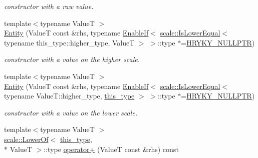 \begin{DoxyCompactItemize}
\begin{DoxyCompactList}\small\item\em constructor with a raw value. \end{DoxyCompactList}\item 
\hypertarget{classhryky_1_1scale_1_1_entity_a1928287ec77e5a97d0b700d4406a5f54}{{\footnotesize template$<$typename Value\-T $>$ }\\\hyperlink{classhryky_1_1scale_1_1_entity_a1928287ec77e5a97d0b700d4406a5f54}{Entity} (Value\-T const \&rhs, typename \hyperlink{classhryky_1_1_enable_if}{Enable\-If}$<$ \hyperlink{classhryky_1_1scale_1_1_is_lower_equal}{scale\-::\-Is\-Lower\-Equal}$<$ typename this\-\_\-type\-::higher\-\_\-type, Value\-T $>$ $>$\-::type $\ast$=\hyperlink{common_8h_a4cd4ac09cfcdbd6b30ee69afc156e210}{H\-R\-Y\-K\-Y\-\_\-\-N\-U\-L\-L\-P\-T\-R})}\label{classhryky_1_1scale_1_1_entity_a1928287ec77e5a97d0b700d4406a5f54}

\begin{DoxyCompactList}\small\item\em constructor with a value on the higher scale. \end{DoxyCompactList}\item 
\hypertarget{classhryky_1_1scale_1_1_entity_a1a7021b0210b2967d25f541371468947}{{\footnotesize template$<$typename Value\-T $>$ }\\\hyperlink{classhryky_1_1scale_1_1_entity_a1a7021b0210b2967d25f541371468947}{Entity} (Value\-T const \&rhs, typename \hyperlink{classhryky_1_1_enable_if}{Enable\-If}$<$ \hyperlink{classhryky_1_1scale_1_1_is_lower_equal}{scale\-::\-Is\-Lower\-Equal}$<$ typename Value\-T\-::higher\-\_\-type, \hyperlink{classhryky_1_1scale_1_1_entity_af312f46dc3d31369144a960d386790c3}{this\-\_\-type} $>$ $>$\-::type $\ast$=\hyperlink{common_8h_a4cd4ac09cfcdbd6b30ee69afc156e210}{H\-R\-Y\-K\-Y\-\_\-\-N\-U\-L\-L\-P\-T\-R})}\label{classhryky_1_1scale_1_1_entity_a1a7021b0210b2967d25f541371468947}

\begin{DoxyCompactList}\small\item\em constructor with a value on the lower scale. \end{DoxyCompactList}\item 
\hypertarget{classhryky_1_1scale_1_1_entity_a0e711f3283eab1061dc77c94bcb13ccf}{{\footnotesize template$<$typename Value\-T $>$ }\\\hyperlink{classhryky_1_1scale_1_1_lower_of}{scale\-::\-Lower\-Of}$<$ \hyperlink{classhryky_1_1scale_1_1_entity_af312f46dc3d31369144a960d386790c3}{this\-\_\-type}, \\*
Value\-T $>$\-::type \hyperlink{classhryky_1_1scale_1_1_entity_a0e711f3283eab1061dc77c94bcb13ccf}{operator+} (Value\-T const \&rhs) const }\label{classhryky_1_1scale_1_1_entity_a0e711f3283eab1061dc77c94bcb13ccf}


\end{DoxyCompactItemize}
